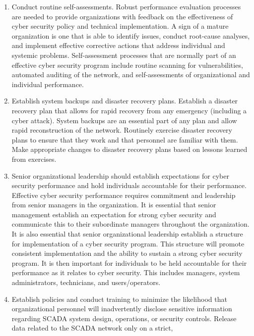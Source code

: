 \documentclass{article}
\begin{document}
\begin{enumerate}
\def\labelenumi{\arabic{enumi}.}
\setcounter{enumi}{17}
\tightlist
\item
  Conduct routine self-assessments. Robust performance evaluation
  processes are needed to provide organizations with feedback on the
  effectiveness of cyber security policy and technical implementation. A
  sign of a mature organization is one that is able to identify issues,
  conduct root-cause analyses, and implement effective corrective
  actions that address individual and systemic problems. Self-assessment
  processes that are normally part of an effective cyber security
  program include routine scanning for vulnerabilities, automated
  auditing of the network, and self-assessments of organizational and
  individual performance.
\item
  Establish system backups and disaster recovery plans. Establish a
  disaster recovery plan that allows for rapid recovery from any
  emergency (including a cyber attack). System backups are an essential
  part of any plan and allow rapid reconstruction of the network.
  Routinely exercise disaster recovery plans to ensure that they work
  and that personnel are familiar with them. Make appropriate changes to
  disaster recovery plans based on lessons learned from exercises.
\item
  Senior organizational leadership should establish expectations for
  cyber security performance and hold individuals accountable for their
  performance. Effective cyber security performance requires commitment
  and leadership from senior managers in the organization. It is
  essential that senior management establish an expectation for strong
  cyber security and communicate this to their subordinate managers
  throughout the organization. It is also essential that senior
  organizational leadership establish a structure for implementation of
  a cyber security program. This structure will promote consistent
  implementation and the ability to sustain a strong cyber security
  program. It is then important for individuals to be held accountable
  for their performance as it relates to cyber security. This includes
  managers, system administrators, technicians, and users/operators.
\item
  Establish policies and conduct training to minimize the likelihood
  that organizational personnel will inadvertently disclose sensitive
  information regarding SCADA system design, operations, or security
  controls. Release data related to the SCADA network only on a strict,

\end{enumerate}
\end{document}
